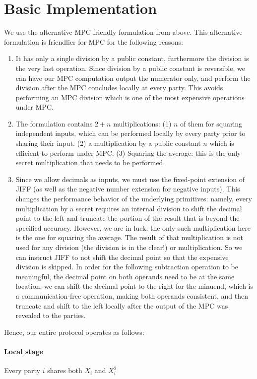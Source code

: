 \documentclass[11pt, oneside]{article}   	%
\begin{document}
\section{Basic Implementation}
We use the alternative MPC-friendly formulation from above. This alternative formulation is friendlier for MPC for the following reasons:
\begin{enumerate}
    \item It has only a single division by a public constant, furthermore the division is the very last operation. Since division by a public constant is reversible, we can have our MPC computation output the numerator only, and perform the division after the MPC concludes locally at every party. This avoids performing an MPC division which is one of the most expensive operations under MPC.
    \item The formulation contains $2 + n$ multiplications: (1) $n$ of them for squaring independent inputs, which can be performed locally by every party prior to sharing their input. (2) a multiplication by a public constant $n$ which is efficient to perform under MPC. (3) Squaring the average: this is the only secret multiplication that needs to be performed.
    \item Since we allow decimals as inputs, we must use the fixed-point extension of JIFF (as well as the negative number extension for negative inputs). This changes the performance behavior of the underlying primitives: namely, every multiplication by a secret requires an internal division to shift the decimal point to the left and truncate the portion of the result that is beyond the specified accuracy. However, we are in luck: the only such multiplication here is the one for squaring the average. The result of that multiplication is not used for any division (the division is in the clear!) or multiplication. So we can instruct JIFF to not shift the decimal point so that the expensive division is skipped. In order for the following subtraction operation to be meaningful, the decimal point on both operands need to be at the same location, we can shift the decimal point to the right for the minuend, which is a communication-free operation, making both operands consistent, and then truncate and shift to the left locally after the output of the MPC was revealed to the parties.
\end{enumerate}

Hence, our entire protocol operates as follows:
\paragraph{Local stage}
Every party $i$ shares both $X_i$ and $X_i^2$
\end{document}
